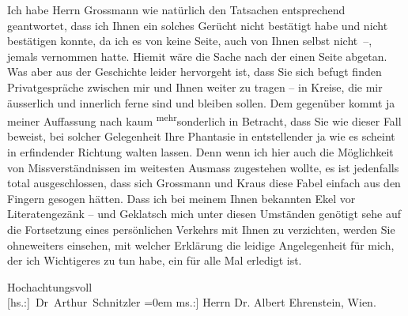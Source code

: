 \pstart
           Ich habe Herrn Grossmann wie natürlich den
               Tatsachen entsprechend geantwortet, dass ich Ihnen ein solches Gerücht nicht
               bestätigt habe und nicht bestätigen konnte, da ich es von keine Seite, auch von Ihnen
               selbst nicht –, jemals vernommen hatte. Hiemit wäre die Sache nach der einen Seite
               abgetan. Was aber aus der Geschichte leider hervorgeht ist, dass Sie sich befugt
               finden Privatge{\pb}spräche zwischen mir und Ihnen weiter zu tragen –
               in Kreise, die mir äusserlich und innerlich ferne sind und bleiben sollen. Dem
               gegenüber kommt ja meine\introOben{}r\introOben{} Auffassung \introOben{}nach\introOben{} kaum \substVorne{}\textsuperscript{mehr}\substDazwischen{}sonderlich\substHinten{} in Betracht, dass Sie wie dieser Fall beweist, bei solcher Gelegenheit Ihre
               Phantasie in entstellender ja wie es scheint in erfindender Richtung walten lassen.
               Denn wenn ich hier auch die Möglichkeit von Missverständnissen im weitesten Ausmass
               zugestehen wollte, es ist jedenfalls total ausgeschlossen, dass sich Grossmann und Kraus diese Fabel einfach aus den Fingern gesogen hätten. Dass ich bei
               meinem Ihnen bekannten Ekel vor Literatengezänk – und Geklatsch mich unter diesen
               Umständen genötigt sehe auf die Fortsetzung eines persönlichen Verkehrs mit Ihnen zu
               verzichten, werden Sie ohneweiters einsehen, mit welcher Erklärung die leidige
               Angelegenheit für mich, der ich Wichtigeres zu tun habe, ein für alle Mal erledigt
               ist.\pend
           
\pstart
           Hochachtungsvoll{\\[\baselineskip]}\spacefill\mbox{{[}hs.:{]} Dr Arthur Schnitzler}\pend
           \leftskip=0em{}
\pstart
           \noindent{}{[}ms.:{]} Herrn Dr. Albert Ehrenstein, Wien.\pend
           \endnumbering{}  
      